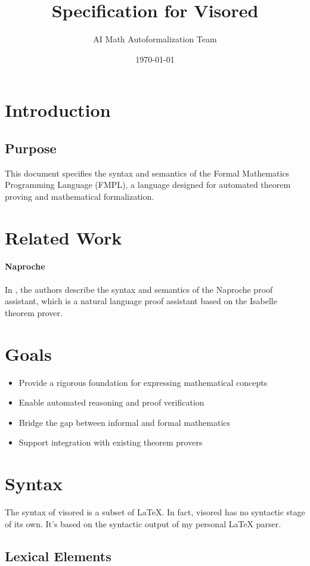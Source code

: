\documentclass[11pt]{article}
\title{Specification for Visored}
\author{AI Math Autoformalization Team}
\date{\today}
\begin{document}
\maketitle
\tableofcontents

\section{Introduction}
\subsection{Purpose}
This document specifies the syntax and semantics of the Formal Mathematics Programming Language (FMPL), a language designed for automated theorem proving and mathematical formalization.

\section{Related Work}

\paragraph{Naproche} In \cite{Lon2021TheIN}, the authors describe the syntax and semantics of the Naproche proof assistant, which is a natural language proof assistant based on the Isabelle theorem prover.
\section{Goals}
\begin{itemize}
    \item Provide a rigorous foundation for expressing mathematical concepts
    \item Enable automated reasoning and proof verification
    \item Bridge the gap between informal and formal mathematics
    \item Support integration with existing theorem provers
\end{itemize}

\section{Syntax}

The syntax of visored is a subset of LaTeX. In fact, visored has no syntactic stage of its own. It's based on the syntactic output of my personal LaTeX parser.

\subsection{Lexical Elements}
\end{document}
